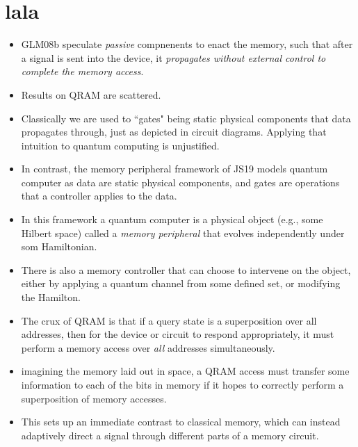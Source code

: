 \documentclass[14pt,twoside,reqno]{amsart}
\begin{document}
\section{lala}
\begin{itemize}
  \item GLM08b speculate \emph{passive} compnenents to enact the memory, such
    that after a signal is sent into the device, it \emph{propagates
    without external control to complete the memory access}.
  \item Results on QRAM are scattered.
  \item Classically we are used to ``gates" being static physical components
    that data propagates through, just as depicted in circuit diagrams.
    Applying that intuition to quantum computing is unjustified.
  \item In contrast, the memory peripheral framework of JS19 models quantum
    computer as data are static physical components, and gates are operations
    that a controller applies to the data.
  \item In this framework a quantum computer is a physical object (e.g., some
    Hilbert space) called a \emph{memory peripheral} that evolves independently
    under som Hamiltonian.
  \item There is also a memory controller that can choose to intervene on the
    object, either by applying a quantum channel from some defined set,
    or modifying the Hamilton.
  \item The crux of QRAM is that if a query state is a superposition over
    all addresses, then for the device or circuit to respond appropriately,
    it must perform a memory access over \emph{all} addresses simultaneously.
  \item imagining the memory laid out in space, a QRAM access must transfer
    some information to each of the bits in memory if it hopes to correctly
    perform a superposition of memory accesses. 
  \item This sets up an immediate contrast to classical memory, which can
    instead adaptively direct a signal through different parts of a memory
    circuit.
\end{itemize}
\end{document}
